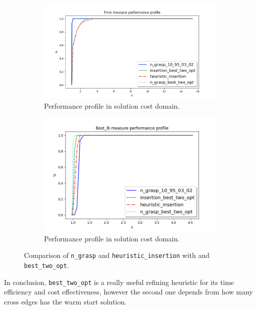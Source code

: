 \begin{figure}
\centering
\begin{subfigure}{.7\textwidth}
	\centering
	\includegraphics[width=\columnwidth]{../res/Lgrasp_insertion_refining_LA_time.png}
	\caption{Performance profile in solution cost domain.}
	\label{fig:Lgrasp_insertion_refining_LA_time}
\end{subfigure}
\begin{subfigure}{.7\textwidth}
	\centering
	\includegraphics[width=\columnwidth]{../res/Lgrasp_insertion_refining_LA_lb.png}
	\caption{Performance profile in solution cost domain.}
	\label{fig:Lgrasp_insertion_refining_LA_lb}
\end{subfigure}
\caption{Comparison of \texttt{n\_grasp} and \texttt{heuristic\_insertion} with and \texttt{best\_two\_opt}.}
\label{fig:pp_Lgrasp_insertion_refining}
\end{figure}

In conclusion, \texttt{best\_two\_opt} is a really useful refining heuristic for its time efficiency and cost effectiveness, however the second one depends from how many cross edges has the warm start solution.
